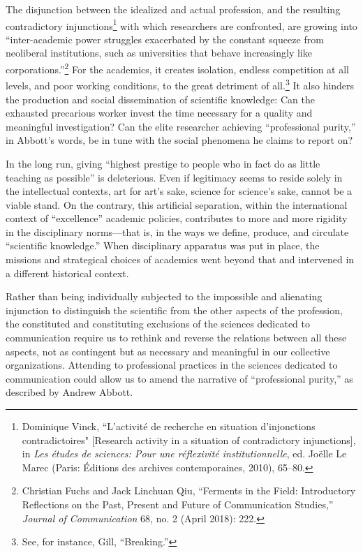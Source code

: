 \documentclass{tufte-handout}
\begin{document}
The disjunction between the idealized and actual profession, and the
resulting contradictory injunctions\footnote{Dominique Vinck,
  ``L'activité de recherche en situation d'injonctions contradictoires"
  {[}Research activity in a situation of contradictory injunctions{]},
  in \emph{Les études de sciences: Pour une réflexivité
  institutionnelle}, ed. Joëlle Le Marec (Paris: Éditions des archives
  contemporaines, 2010), 65--80.} with which researchers are confronted,
are growing into ``inter-academic power struggles exacerbated by the
constant squeeze from neoliberal institutions, such as universities that
behave increasingly like corporations.''\footnote{Christian Fuchs and
  Jack Linchuan Qiu, ``Ferments in the Field: Introductory Reflections
  on the Past, Present and Future of Communication Studies,''
  \emph{Journal of Communication} 68, no. 2 (April 2018): 222.} For the
academics, it creates isolation, endless competition at all levels, and
poor working conditions, to the great detriment of all.\footnote{See,
  for instance, Gill, ``Breaking.''} It also hinders the production and
social dissemination of scientific knowledge: Can the exhausted
precarious worker invest the time necessary for a quality and meaningful
investigation? Can the elite researcher achieving ``professional
purity,'' in Abbott's words, be in tune with the social phenomena he
claims to report on?

In the long run, giving ``highest prestige to people who in fact do as
little teaching as possible'' is deleterious. Even if legitimacy seems
to reside solely in the intellectual contexts, art for art's sake,
science for science's sake, cannot be a viable stand. On the contrary,
this artificial separation, within the international context of
``excellence'' academic policies, contributes to more and more rigidity
in the disciplinary norms---that is, in the ways we define, produce, and
circulate ``scientific knowledge.'' When disciplinary apparatus was put
in place, the missions and strategical choices of academics went beyond
that and intervened in a different historical context.

Rather than being individually subjected to the impossible and
alienating injunction to distinguish the scientific from the other
aspects of the profession, the constituted and constituting exclusions
of the sciences dedicated to communication require us to rethink and
reverse the relations between all these aspects, not as contingent but
as necessary and meaningful in our collective organizations. Attending
to professional practices in the sciences dedicated to communication
could allow us to amend the narrative of ``professional purity,'' as
described by Andrew Abbott.
\end{document}
